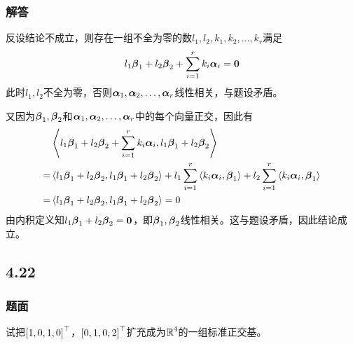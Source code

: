 \documentclass{beamer}
\begin{document}
\begin{frame}[allowframebreaks]
    \frametitle{解答}
    反设结论不成立，则存在一组不全为零的数\(l_1,l_2,k_1,k_2,\dots,k_r\)满足
    \begin{equation*}
        l_1\vecbeta_1+l_2\vecbeta_2+\sum_{i=1}^rk_i\vecal_i=\veczero
    \end{equation*}
    此时\(l_1,l_2\)不全为零，否则\(\enums{\vecal}{r}\)线性相关，与题设矛盾。

    又因为\(\vecbeta_1,\vecbeta_2\)和\(\enums{\vecal}{r}\)中的每个向量正交，因此有
    \begin{align*}
          & \indot{l_1\vecbeta_1+l_2\vecbeta_2+\sum_{i=1}^rk_i\vecal_i}{l_1\vecbeta_1+l_2\vecbeta_2}   \\
        = & \indot{l_1\vecbeta_1+l_2\vecbeta_2}{l_1\vecbeta_1+l_2\vecbeta_2}
        +l_1\sum_{i=1}^r\indot{k_i\vecal_i}{\vecbeta_1}+l_2\sum_{i=1}^r\indot{k_i\vecal_i}{\vecbeta_1} \\
        = & \indot{l_1\vecbeta_1+l_2\vecbeta_2}{l_1\vecbeta_1+l_2\vecbeta_2}=0
    \end{align*}
    由内积定义知\(l_1\vecbeta_1+l_2\vecbeta_2=\veczero\)，即\(\vecbeta_1,\vecbeta_2\)线性相关。这与题设矛盾，因此结论成立。
\end{frame}

\subsection*{4.22}
\begin{frame}
    \frametitle{题面}

    试把\(\myvec{1,0,1,0}\)，\(\myvec{0,1,0,2}\)扩充成为\(\rea^4\)的一组标准正交基。

\end{frame}
\end{document}
